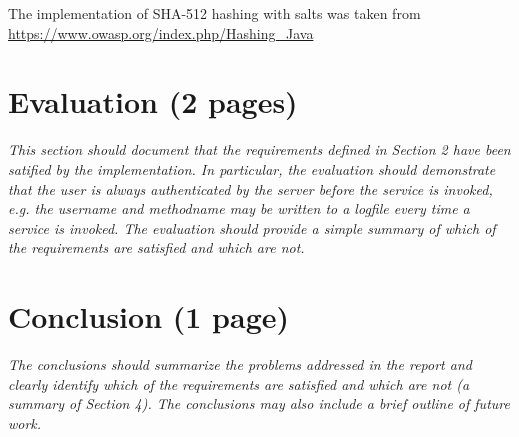 \documentclass[12pt]{article}
\begin{document}
The implementation of SHA-512 hashing with salts was taken from \url{https://www.owasp.org/index.php/Hashing_Java}

\newpage

\section{Evaluation (2 pages)}
\label{sec:Evaluation}

\textit{This section should document that the requirements defined in Section 2 have been satified by the implementation. In particular, the evaluation should demonstrate that the user is always authenticated by the server before the service is invoked, e.g. the username and methodname may be written to a logfile every time a service is invoked.
The evaluation should provide a simple summary of which of the requirements are satisfied and which are not.}

\newpage

\section{Conclusion (1 page)}
\label{sec:Conclusion}

\textit{The conclusions should summarize the problems addressed in the report and clearly identify which of the requirements are satisfied and which are not (a summary of Section 4). The conclusions may also include a brief outline of future work.}




%
\end{document}
